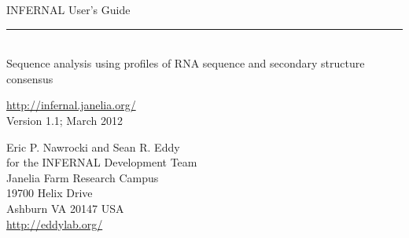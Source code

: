 \begin{titlepage}
{\Large

\vspace*{\fill}

\noindent
{\Huge {INFERNAL User's Guide}} \vspace{-8.0pt} \\ 
\rule[2pt]{\textwidth}{1pt} \\
\hspace*{\fill} {\large {Sequence analysis using profiles of RNA
sequence and secondary structure consensus} \\ }

\vspace*{\fill}

\begin{center}
\url{http://infernal.janelia.org/}\\
Version 1.1; March 2012 \\ 

\vspace*{\fill}

Eric P. Nawrocki and Sean R. Eddy\\
for the INFERNAL Development Team\\
Janelia Farm Research Campus\\
19700 Helix Drive\\
Ashburn VA 20147 USA\\
\url{http://eddylab.org/} \\
\end{center}

\vspace*{\fill}

}
\end{titlepage}
